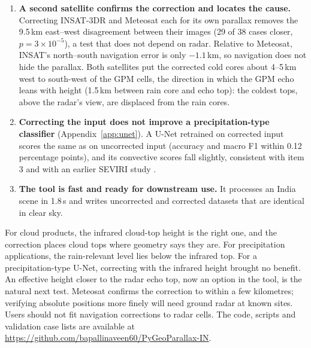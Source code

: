\begin{enumerate}
\begin{itemize}
    \item In the 14 cases of 2022--2024, ERA5 profiles change the offsets by less than 0.5\,km and terrain by less than 0.1\,km; terrain moves clear-sky ground in the Himalaya by up to 6\,km.
  \end{itemize}
  \item \textbf{A second satellite confirms the correction and locates the cause.} Correcting INSAT-3DR and Meteosat each for its own parallax removes the 9.5\,km east--west disagreement between their images (29 of 38 cases closer, $p=3\times10^{-5}$), a test that does not depend on radar. Relative to Meteosat, INSAT's north--south navigation error is only $-1.1$\,km, so navigation does not hide the parallax. Both satellites put the corrected cold cores about 4--5\,km west to south-west of the GPM cells, the direction in which the GPM echo leans with height (1.5\,km between rain core and echo top): the coldest tops, above the radar's view, are displaced from the rain cores.
  \item \textbf{Correcting the input does not improve a precipitation-type classifier} (Appendix~\ref{app:unet}). A U-Net retrained on corrected input scores the same as on uncorrected input (accuracy and macro F1 within 0.12 percentage points), and its convective scores fall slightly, consistent with item 3 and with an earlier SEVIRI study \citep{dadderio2023}.
  \item \textbf{The tool is fast and ready for downstream use.} It processes an India scene in 1.8\,s and writes uncorrected and corrected datasets that are identical in clear sky.
\end{enumerate}

For cloud products, the infrared cloud-top height is the right one, and the correction places cloud tops where geometry says they are. For precipitation applications, the rain-relevant level lies below the infrared top. For a precipitation-type U-Net, correcting with the infrared height brought no benefit. An effective height closer to the radar echo top, now an option in the tool, is the natural next test. Meteosat confirms the correction to within a few kilometres; verifying absolute positions more finely will need ground radar at known sites. Users should not fit navigation corrections to radar cells. The code, scripts and validation case lists are available at \url{https://github.com/bapallinaveen60/PyGeoParallax-IN}.

